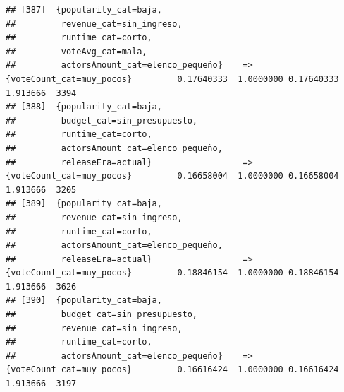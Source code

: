 \documentclass[
]{article}
\begin{document}
\begin{verbatim}
## [387]  {popularity_cat=baja,                                                                                                    
##         revenue_cat=sin_ingreso,                                                                                                
##         runtime_cat=corto,                                                                                                      
##         voteAvg_cat=mala,                                                                                                       
##         actorsAmount_cat=elenco_pequeño}    => {voteCount_cat=muy_pocos}         0.17640333  1.0000000 0.17640333 1.913666  3394
## [388]  {popularity_cat=baja,                                                                                                    
##         budget_cat=sin_presupuesto,                                                                                             
##         runtime_cat=corto,                                                                                                      
##         actorsAmount_cat=elenco_pequeño,                                                                                        
##         releaseEra=actual}                  => {voteCount_cat=muy_pocos}         0.16658004  1.0000000 0.16658004 1.913666  3205
## [389]  {popularity_cat=baja,                                                                                                    
##         revenue_cat=sin_ingreso,                                                                                                
##         runtime_cat=corto,                                                                                                      
##         actorsAmount_cat=elenco_pequeño,                                                                                        
##         releaseEra=actual}                  => {voteCount_cat=muy_pocos}         0.18846154  1.0000000 0.18846154 1.913666  3626
## [390]  {popularity_cat=baja,                                                                                                    
##         budget_cat=sin_presupuesto,                                                                                             
##         revenue_cat=sin_ingreso,                                                                                                
##         runtime_cat=corto,                                                                                                      
##         actorsAmount_cat=elenco_pequeño}    => {voteCount_cat=muy_pocos}         0.16616424  1.0000000 0.16616424 1.913666  3197

\end{verbatim}
\end{document}
